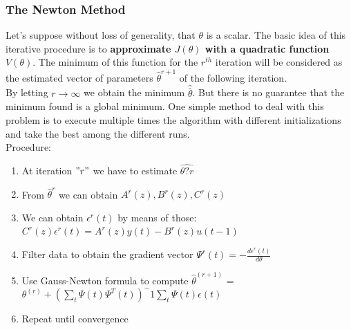 \documentclass[10pt,a4paper]{article}
\begin{document}
\subsubsection{The Newton Method}
Let's suppose without loss of generality, that $\theta$ is a scalar. The basic idea of this iterative procedure is to \textbf{approximate $J(\theta)$ with a quadratic function $V(\theta)$}. The minimum of this function for the $r^{th}$ iteration will be considered as the estimated vector of parameters $\hat{\theta}^{r+1}$ of the following iteration. \\ By letting $r \rightarrow \infty$ we obtain the minimum $\hat{\bar{\theta}}$. But there is no guarantee that the minimum found is a global minimum. One simple method to deal with this problem is to execute multiple times the algorithm with different initializations and take the best among the different runs. \\
Procedure:
\begin{enumerate}
	\item At iteration $"r"$ we have to estimate $\hat{\theta?r}$
	\item From $\hat{\theta}^r$ we can obtain $A^r(z),B^r(z),C^r(z)$
	\item We can obtain $\epsilon^r(t)$ by means of those: $C^r(z)\epsilon^r(t)=A^r(z)y(t)-B^r(z)u(t-1)$
	\item Filter data to obtain the gradient vector $\Psi^r(t) = - \frac{d\epsilon^r(t)}{d\theta}$
	\item Use Gauss-Newton formula to compute $\hat{\theta}^{(r+1)}$ = $\theta^{(r)}+(\sum_t\Psi(t)\Psi^T(t))^-1\sum_t\Psi(t)\epsilon(t)$
	\item Repeat until convergence
\end{enumerate}
\end{document}
